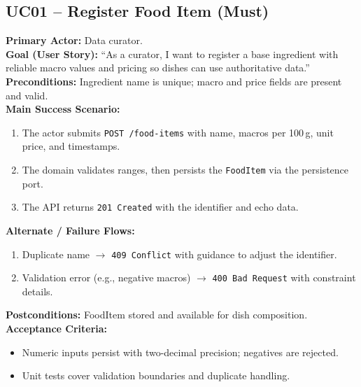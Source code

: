 \documentclass[11pt]{article}
\begin{document}
\subsection*{UC01 -- Register Food Item (Must)}
\textbf{Primary Actor:} Data curator.\\
\textbf{Goal (User Story):} ``As a curator, I want to register a base ingredient with reliable macro values and pricing so dishes can use authoritative data.''\\
\textbf{Preconditions:} Ingredient name is unique; macro and price fields are present and valid.\\
\textbf{Main Success Scenario:}
\begin{enumerate}[label=\arabic*.]
  \item The actor submits \texttt{POST /food-items} with name, macros per 100\,g, unit price, and timestamps.
  \item The domain validates ranges, then persists the \texttt{FoodItem} via the persistence port.
  \item The API returns \texttt{201 Created} with the identifier and echo data.
\end{enumerate}
\textbf{Alternate / Failure Flows:}
\begin{enumerate}[label=\arabic*F.]
  \item Duplicate name $\rightarrow$ \texttt{409 Conflict} with guidance to adjust the identifier.
  \item Validation error (e.g., negative macros) $\rightarrow$ \texttt{400 Bad Request} with constraint details.
\end{enumerate}
\textbf{Postconditions:} FoodItem stored and available for dish composition.\\
\textbf{Acceptance Criteria:}
\begin{itemize}[noitemsep]
  \item Numeric inputs persist with two-decimal precision; negatives are rejected.
  \item Unit tests cover validation boundaries and duplicate handling.
\end{itemize}
\end{document}
